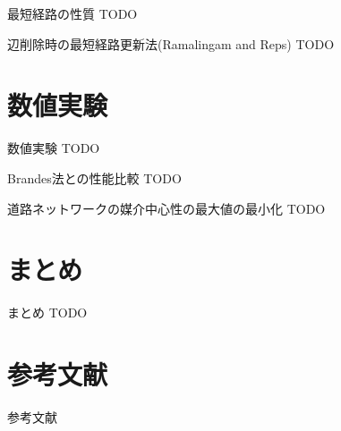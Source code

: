 \documentclass[dvipdfmx,fleqn]{beamer}
\begin{document}
\begin{frame}{最短経路の性質}
  \alert{TODO}
\end{frame}

\begin{frame}{辺削除時の最短経路更新法(Ramalingam and Reps)}
  \alert{TODO}
\end{frame}

\section{数値実験}
\begin{frame}{数値実験}
  \alert{TODO}
\end{frame}

\begin{frame}{Brandes法との性能比較}
  \alert{TODO}
\end{frame}

\begin{frame}{道路ネットワークの媒介中心性の最大値の最小化}
  \alert{TODO}
\end{frame}

\section{まとめ}
\begin{frame}{まとめ}
  \alert{TODO}
\end{frame}

\appendix
\section{参考文献}
\begin{frame}[allowframebreaks]{参考文献}
  \printbibliography[title=]
\end{frame}
\end{document}
